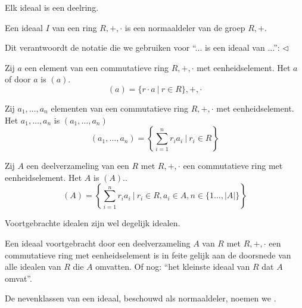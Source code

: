 \documentclass[main.tex]{subfiles}
\begin{document}
\begin{st}
  Elk ideaal is een deelring.
\end{st}

\begin{ei}
  Een ideaal $I$ van een ring $R,+,\cdot$ is een normaaldeler van de groep $R,+$.
\end{ei}

\begin{opm}
  Dit verantwoordt de notatie die we gebruiken voor ``... is een ideaal van ...'': $\triangleleft$
\end{opm}

\begin{de}
  Zij $a$ een element van een commutatieve ring $R,+,\cdot$ met eenheidselement.
  Het  $a$ of  door $a$ is $(a)$.
  \[ (a) = \{r \cdot a \ |\ r \in R \},+,\cdot \]
\end{de}

\begin{de}
  Zij $a_{1},\dotsc,a_{n}$ elementen van een commutatieve ring $R,+,\cdot$ met eenheidselement.
  Het  $a_{1},\dotsc,a_{n}$ is $(a_{1},\dotsc,a_{n})$
  \[ (a_{1},\dotsc,a_{n}) = \left\{ \sum_{i=1}^{n}r_{i}a_{i} \ |\ r_{i} \in R \right\} \]
\end{de}

\begin{de}
  Zij $A$ een deelverzameling van een $R$ met $R,+,\cdot$ een commutatieve ring met eenheidselement.
  Het  $A$ is $(A)$..
  \[ (A) = \left\{ \sum_{i=1}^{n}r_{i}a_{i} \ |\ r_{i} \in R, a_{i} \in A, n\in \{1 \dotsc, |A|\} \right\}\]
\end{de}

\begin{st}
  Voortgebrachte idealen zijn wel degelijk idealen.
\end{st}

\begin{opm}
  Een ideaal voortgebracht door een deelverzameling $A$ van $R$ met $R,+,\cdot$ een commutatieve ring met eenheidselement is in feite gelijk aan de doorsnede van alle idealen van $R$ die $A$ omvatten.
  Of nog: ``het kleinste ideaal van $R$ dat $A$ omvat''.
\end{opm}

\begin{de}
  De nevenklassen van een ideaal, beschouwd als normaaldeler, noemen we .
\end{de}
\end{document}
